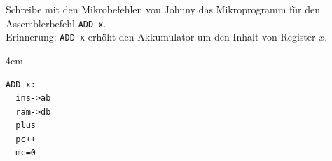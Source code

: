 \question[2]
Schreibe mit den Mikrobefehlen von Johnny das Mikroprogramm für den Assemblerbefehl
\texttt{ADD x}.\\
Erinnerung: \texttt{ADD x} erhöht den Akkumulator um den Inhalt von Register $x$.

\begin{solutionbox}{4cm}
\begin{verbatim}
ADD x:
  ins->ab
  ram->db
  plus
  pc++
  mc=0
\end{verbatim}
\end{solutionbox}

